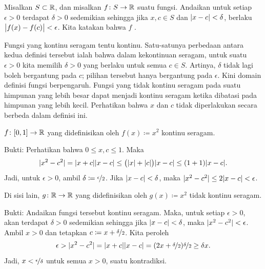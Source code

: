 \begin{defn}
Misalkan $S \subset {\mathbb{R}}$, dan misalkan $f \colon S \to {\mathbb{R}}$ suatu fungsi.
Andaikan untuk setiap $\epsilon > 0$ terdapat $\delta > 0$
sedemikian sehingga jika $x, c \in S$ dan
$\lvert {x-c} \rvert < \delta$, berlaku $\bigl\lvert {f(x)-f(c)} \bigr\rvert < \epsilon$.
Kita katakan bahwa $f$ \emph{}.
\end{defn}

Fungsi yang kontinu seragam tentu kontinu.
Satu-satunya perbedaan antara kedua definisi tersebut ialah bahwa dalam
kekontinuan seragam, untuk suatu $\epsilon > 0$ kita memilih $\delta > 0$
yang berlaku untuk semua $c \in S$.  Artinya, $\delta$ tidak lagi boleh
bergantung pada $c$; pilihan tersebut hanya bergantung pada $\epsilon$.  Kini domain
definisi fungsi berpengaruh.  Fungsi yang tidak kontinu seragam pada suatu
himpunan yang lebih besar dapat menjadi kontinu seragam ketika dibatasi pada
himpunan yang lebih kecil.
Perhatikan bahwa $x$ dan $c$ tidak diperlakukan secara berbeda dalam definisi
ini.

\begin{example}
$f \colon [0,1] \to {\mathbb{R}}$ yang didefinisikan oleh $f(x) \coloneqq x^2$ kontinu
seragam.

Bukti: Perhatikan bahwa $0 \leq x,c \leq 1$.  Maka
\begin{equation*}
\lvert {x^2-c^2} \rvert = \lvert {x+c} \rvert\lvert {x-c} \rvert
\leq \bigl(\lvert {x} \rvert+\lvert {c} \rvert\bigr) \lvert {x-c} \rvert
\leq (1+1)\lvert {x-c} \rvert .
\end{equation*}
Jadi, untuk $\epsilon > 0$, ambil $\delta \coloneqq \nicefrac{\epsilon}{2}$.
Jika $\lvert {x-c} \rvert < \delta$, maka $\lvert {x^2-c^2} \rvert \leq 2 \lvert {x-c} \rvert < \epsilon$.

\medskip

Di sisi lain, $g \colon {\mathbb{R}} \to {\mathbb{R}}$ yang didefinisikan oleh
$g(x) \coloneqq x^2$ tidak kontinu seragam.

Bukti: Andaikan fungsi tersebut kontinu seragam.
Maka, untuk setiap $\epsilon > 0$,
akan terdapat $\delta > 0$ sedemikian sehingga
jika $\lvert {x-c} \rvert < \delta$, maka $\lvert {x^2 -c^2} \rvert < \epsilon$.
Ambil $x > 0$ dan tetapkan
$c \coloneqq x+\nicefrac{\delta}{2}$.  Kita peroleh
\begin{equation*}
\epsilon >
\lvert {x^2-c^2} \rvert = \lvert {x+c} \rvert\lvert {x-c} \rvert
=
(2x+\nicefrac{\delta}{2})\nicefrac{\delta}{2} 
\geq 
\delta x .
\end{equation*}
Jadi, $x < \nicefrac{\epsilon}{\delta}$ untuk semua $x > 0$, suatu
kontradiksi.
\end{example}


